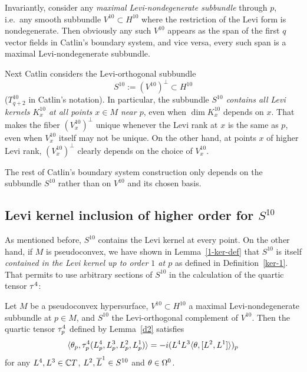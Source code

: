 \documentclass[12pt]{amsart}
\begin{document}
Invariantly, consider any {\em maximal Levi-nondegenerate subbundle} through $p$,
i.e.\ any smooth subbundle  $V^{10} \subset H^{10}$ where the restriction of the Levi form is nondegenerate. 
Then obviously any such $V^{10}$ appears as the span
of the first $q$ vector fields in Catlin's boundary system,
and vice versa, every such span is a maximal Levi-nondegenerate subbundle.
%


Next Catlin considers the Levi-orthogonal subbundle 
$$
	S^{10} := (V^{10})^\perp \subset H^{10}
$$ 
($T^{10}_{q+2}$ in Catlin's notation).
In particular, the subbundle {\em $S^{10}$ contains all Levi kernels $K^{10}_x$ at all points $x\in M$ near $p$},
even when $\dim K^{10}_x$ depends on $x$.
That makes the fiber $(V^{10}_x)^\perp$ unique
whenever the Levi rank at $x$ is the same as $p$,
even when $V^{10}_x$ itself may not be unique.
On the other hand, at points $x$ of higher Levi rank,
$(V^{10}_x)^\perp$ clearly depends on the choice of $V^{10}_x$.

The rest of Catlin's boundary system construction 
only depends on the subbundle $S^{10}$ 
rather than on $V^{10}$ and its chosen basis.



\subsection{Levi kernel inclusion of higher order for $S^{10}$}
As mentioned before, $S^{10}$ contains the Levi kernel at every point.
On the other hand, if $M$ is pseudoconvex,
we have shown in Lemma~\ref{1-ker-def} 
that $S^{10}$ is itself 
{\em contained in the Levi kernel up to order $1$ at $p$}
as defined in Definition~\ref{ker-1}.
That permits to use arbitrary sections of $S^{10}$
in the calculation of the quartic tensor $\tau^4$:

\bc{}
Let $M$ be a pseudoconvex hypersurface,
$V^{10}\subset H^{10}$
a maximal Levi-nondegenerate subbundle at $p\in M$,
and $S^{10}$ the Levi-orthogonal complement of $V^{10}$.
Then the quartic tensor $\tau^4_p$ defined by Lemma~\ref{d2}
satisfies 
$$
	\langle \theta_p, \tau^4_p(L^4_p, L^3_p, L^2_p, L^1_p)\rangle 
	= -i(L^4 L^3 \langle \theta, [L^2, L^1]\rangle)_p
$$
for any $L^4, L^3 \in {\mathbb{C}} T$, $L^2, \overline{L}^1\in S^{10}$ and $\theta\in \Omega^0$.
\ec
\end{document}
